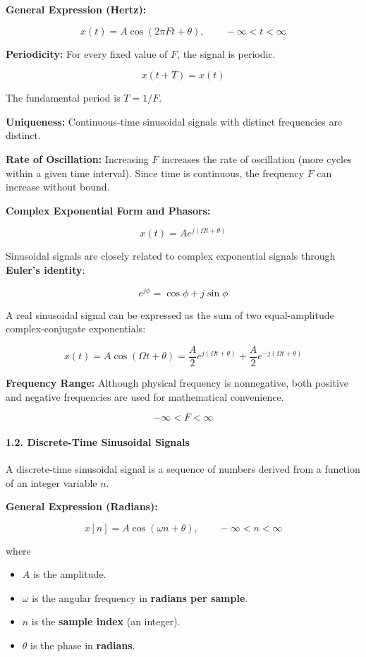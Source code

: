 \textbf{General Expression (Hertz):}

\[  
x(t)=A\cos(2\pi Ft+\theta),  
\qquad -\infty<t<\infty  
\]

\textbf{Periodicity:} For every fixed value of \(F\), the signal is
periodic.

\[  
x(t+T)=x(t)  
\]

The fundamental period is \(T=1/F\).

\textbf{Uniqueness:} Continuous-time sinusoidal signals with distinct
frequencies are distinct.

\textbf{Rate of Oscillation:} Increasing \(F\) increases the rate of
oscillation (more cycles within a given time interval). Since time is
continuous, the frequency \(F\) can increase without bound.

\textbf{Complex Exponential Form and Phasors:}

\[  
x(t)
=
Ae^{j(\Omega t+\theta)}  
\]

Sinusoidal signals are closely related to complex exponential signals
through \textbf{Euler's identity}:

\[  
e^{j\phi}
=
\cos\phi  
+  
j\sin\phi  
\]

A real sinusoidal signal can be expressed as the sum of two
equal-amplitude complex-conjugate exponentials:

\[  
x(t)
=
A\cos(\Omega t+\theta)
=
\frac{A}{2}e^{j(\Omega t+\theta)}  
+  
\frac{A}{2}e^{-j(\Omega t+\theta)}  
\]

\textbf{Frequency Range:} Although physical frequency is nonnegative,
both positive and negative frequencies are used for mathematical
convenience.

\[  
-\infty<F<\infty  
\]

\paragraph{1.2. Discrete-Time Sinusoidal
Signals}\label{discrete-time-sinusoidal-signals}

A discrete-time sinusoidal signal is a sequence of numbers derived from
a function of an integer variable \(n\).

\textbf{General Expression (Radians):}

\[  
x[n]=A\cos(\omega n+\theta),  
\qquad -\infty<n<\infty  
\]

where

\begin{itemize}
\tightlist
\item
  \(A\) is the amplitude.
\item
  \(\omega\) is the angular frequency in \textbf{radians per sample}.
\item
  \(n\) is the \textbf{sample index} (an integer).
\item
  \(\theta\) is the phase in \textbf{radians}.
\end{itemize}

